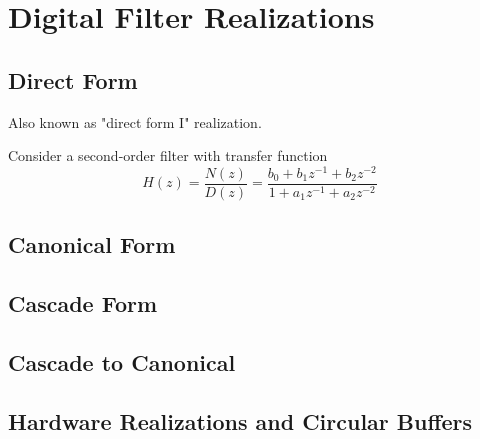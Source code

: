 \section{Digital Filter Realizations}
\subsection{Direct Form}
Also known as "direct form I" realization.

Consider a second-order filter with transfer function
\[
	H(z) = \frac{N(z)}{D(z)} 
		 = \frac{b_0 + b_1z^{-1} + b_2z^{-2}}{1 + a_1z^{-1} + a_2z^{-2}}
\]




\subsection{Canonical Form}


\subsection{Cascade Form}
\subsection{Cascade to Canonical}
\subsection{Hardware Realizations and Circular Buffers}


